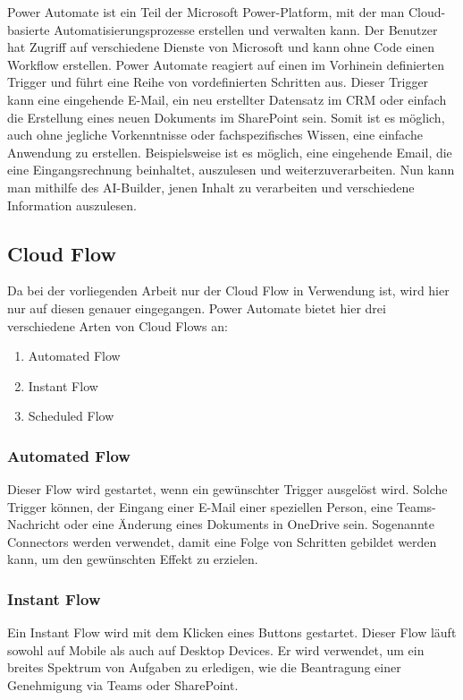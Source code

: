 Power Automate ist ein Teil der Microsoft Power-Platform, mit der man Cloud-basierte Automatisierungsprozesse erstellen und verwalten kann. Der Benutzer hat Zugriff auf verschiedene Dienste von Microsoft und kann ohne Code einen Workflow erstellen. Power Automate reagiert auf einen im Vorhinein definierten Trigger und führt eine Reihe von vordefinierten Schritten aus. Dieser Trigger kann eine eingehende E-Mail, ein neu erstellter Datensatz im CRM oder einfach die Erstellung eines neuen Dokuments im SharePoint sein. Somit ist es möglich, auch ohne jegliche Vorkenntnisse oder fachspezifisches Wissen, eine einfache Anwendung zu erstellen. Beispielsweise ist es möglich, eine eingehende Email, die eine Eingangsrechnung beinhaltet, auszulesen und weiterzuverarbeiten. Nun kann man mithilfe des AI-Builder, jenen Inhalt zu verarbeiten und verschiedene Information auszulesen.

\subsection{Cloud Flow}
Da bei der vorliegenden Arbeit nur der Cloud Flow in Verwendung ist, wird hier nur auf diesen genauer eingegangen. Power Automate bietet hier drei verschiedene Arten von Cloud Flows an:

\begin{enumerate}
    \item Automated Flow
    \item Instant Flow
    \item Scheduled Flow
\end{enumerate}

\subsubsection{Automated Flow}
Dieser Flow wird gestartet, wenn ein gewünschter Trigger ausgelöst wird. Solche Trigger können, der Eingang einer E-Mail einer speziellen Person, eine Teams-Nachricht oder eine Änderung eines Dokuments in OneDrive sein. Sogenannte Connectors werden verwendet, damit eine Folge von Schritten gebildet werden kann, um den gewünschten Effekt zu erzielen.

\subsubsection{Instant Flow}
Ein Instant Flow wird mit dem Klicken eines Buttons gestartet. Dieser Flow läuft sowohl auf Mobile als auch auf Desktop Devices. Er wird verwendet, um ein breites Spektrum von Aufgaben zu erledigen, wie die Beantragung einer Genehmigung via Teams oder SharePoint.

